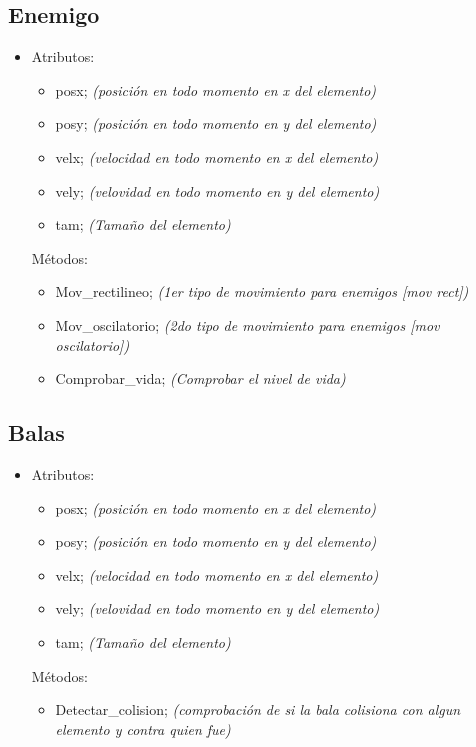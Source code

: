 \documentclass{article}
\begin{document}
\subsection{Enemigo}
\begin{itemize}
    \item Atributos:
    \begin{itemize}
        \item posx; \textit{(posición en todo momento en x del elemento)}
        \item posy; \textit{(posición en todo momento en y del elemento)}
        \item velx; \textit{(velocidad en todo momento en x del elemento)}
        \item vely; \textit{(velovidad en todo momento en y del elemento)}
        \item tam;  \textit{(Tamaño del elemento)}
    \end{itemize}
    Métodos:
    \begin{itemize}
        \item Mov\_rectilineo; \textit{(1er tipo de movimiento para enemigos [mov rect])}
        \item Mov\_oscilatorio; \textit{(2do tipo de movimiento para enemigos [mov oscilatorio])}
        \item Comprobar\_vida; \textit{(Comprobar el nivel de vida)}
    \end{itemize}
\end{itemize}

\subsection{Balas}
\begin{itemize}
    \item Atributos:
    \begin{itemize}
        \item posx; \textit{(posición en todo momento en x del elemento)}
        \item posy; \textit{(posición en todo momento en y del elemento)}
        \item velx; \textit{(velocidad en todo momento en x del elemento)}
        \item vely; \textit{(velovidad en todo momento en y del elemento)}
        \item tam;  \textit{(Tamaño del elemento)}
    \end{itemize}
    Métodos:
    \begin{itemize}
        \item Detectar\_colision; \textit{(comprobación de si la bala colisiona con algun elemento y contra quien fue)}
    \end{itemize}
\end{itemize}
\end{document}
